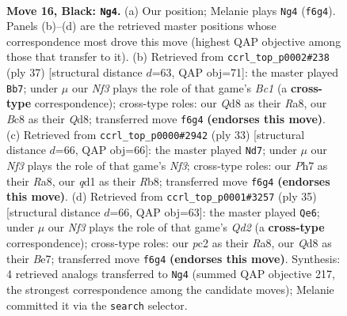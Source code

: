 \documentclass[11pt]{article}
\begin{document}
\clearpage

\begin{figure}[p]\centering
\begin{subfigure}{0.46\textwidth}\centering
\resizebox{\linewidth}{!}{%
\newchessgame
\chessboard[
  setfen={1rbqrk2/p1p2p1p/P1pp1n2/4p3/2P1P3/3P1N2/2P2PP1/R1BQ1RK1 b - - 0 16},
  showmover=false,
  pgfstyle=straightmove, color=movearrow, markmove={f6-g4}
]}
\caption{}
\end{subfigure}\hfill
\begin{subfigure}{0.46\textwidth}\centering
\resizebox{\linewidth}{!}{%
\newchessgame
\chessboard[
  setfen={r1bqr1k1/5pp1/1pp2n1p/p7/P2Pp3/1PN1P2P/2QN1PP1/R1R3K1 b - - 0 19},
  showmover=false,
  pgfstyle=straightmove, color=movearrow, markmove={c8-b7}
]}
\caption{}
\end{subfigure}
\\[4pt]
\begin{subfigure}{0.46\textwidth}\centering
\resizebox{\linewidth}{!}{%
\newchessgame
\chessboard[
  setfen={rr4k1/pb2qppp/3ppn2/2p5/2P1P3/P1NQBP2/1P4PP/R4RK1 b - - 0 17},
  showmover=false,
  pgfstyle=straightmove, color=movearrow, markmove={f6-d7}
]}
\caption{}
\end{subfigure}\hfill
\begin{subfigure}{0.46\textwidth}\centering
\resizebox{\linewidth}{!}{%
\newchessgame
\chessboard[
  setfen={r3r1k1/1p1qbpp1/p2p1n1p/4p3/PPP5/3PBN1P/4QPP1/R2R2K1 b - - 0 18},
  showmover=false,
  pgfstyle=straightmove, color=movearrow, markmove={d7-e6}
]}
\caption{}
\end{subfigure}
\caption{\textbf{Move 16, Black: \texttt{Ng4}.} (a) Our position; Melanie plays \texttt{Ng4} (\texttt{f6g4}). Panels (b)--(d) are the retrieved master positions whose correspondence most drove this move (highest QAP objective among those that transfer to it). (b) Retrieved from \texttt{ccrl\_top\_p0002\#238} (ply 37) [structural distance $d$=63, QAP obj=71]: the master played \texttt{Bb7}; under $\mu$ our \emph{Nf3} plays the role of that game's \emph{Bc1} (a \textbf{cross-type} correspondence); cross-type roles: our \emph{Q}d8 as their \emph{R}a8, our \emph{B}c8 as their \emph{Q}d8; transferred move \texttt{f6g4} \textbf{(endorses this move)}. (c) Retrieved from \texttt{ccrl\_top\_p0000\#2942} (ply 33) [structural distance $d$=66, QAP obj=66]: the master played \texttt{Nd7}; under $\mu$ our \emph{Nf3} plays the role of that game's \emph{Nf3}; cross-type roles: our \emph{P}h7 as their \emph{R}a8, our \emph{q}d1 as their \emph{R}b8; transferred move \texttt{f6g4} \textbf{(endorses this move)}. (d) Retrieved from \texttt{ccrl\_top\_p0001\#3257} (ply 35) [structural distance $d$=66, QAP obj=63]: the master played \texttt{Qe6}; under $\mu$ our \emph{Nf3} plays the role of that game's \emph{Qd2} (a \textbf{cross-type} correspondence); cross-type roles: our \emph{p}c2 as their \emph{R}a8, our \emph{Q}d8 as their \emph{B}e7; transferred move \texttt{f6g4} \textbf{(endorses this move)}. Synthesis: 4 retrieved analogs transferred to \texttt{Ng4} (summed QAP objective 217, the strongest correspondence among the candidate moves); Melanie committed it via the \texttt{search} selector.}
\label{fig:thought-m31}
\end{figure}
\end{document}

